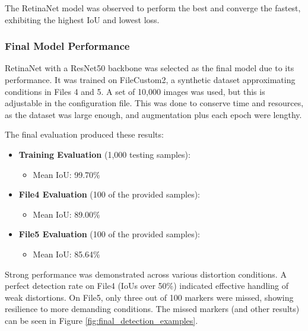 \documentclass[conference]{IEEEtran}
\begin{document}
The RetinaNet model was observed to perform the best and converge the fastest, exhibiting the highest IoU and lowest loss.

\subsubsection{Final Model Performance}

RetinaNet with a ResNet50 backbone was selected as the final model due to its performance. It was trained on FileCustom2, a 
synthetic dataset approximating conditions in Files 4 and 5. A set of 10,000 images was used, but this is adjustable in the configuration 
file. This was done to conserve time and resources, as the dataset was large enough, and augmentation plus each epoch were lengthy.

The final evaluation produced these results:

\begin{itemize}
    \item \textbf{Training Evaluation} (1,000 testing samples):
        \begin{itemize}
            \item Mean IoU: 99.70\%
        \end{itemize}
    \item \textbf{File4 Evaluation} (100 of the provided samples):
        \begin{itemize}
            \item Mean IoU: 89.00\%
        \end{itemize}
    \item \textbf{File5 Evaluation} (100 of the provided samples):
        \begin{itemize}
            \item Mean IoU: 85.64\%
        \end{itemize}
\end{itemize}

Strong performance was demonstrated across various distortion conditions. A perfect detection rate on File4 (IoUs over 50\%) indicated 
effective handling of weak distortions. On File5, only three out of 100 markers were missed, showing resilience to more demanding conditions. 
The missed markers (and other results) can be seen in Figure \ref{fig:final_detection_examples}.
\end{document}
